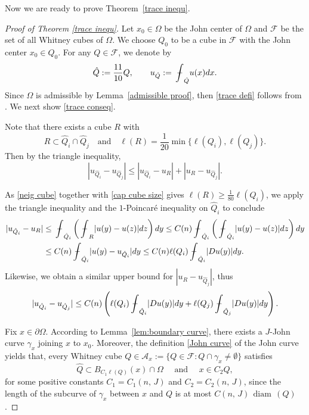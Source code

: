 \documentclass[reqno,11pt]{amsart}
\def\bint{{\ifinner\rlap{\bf\kern.35em--}
\int\else\rlap{\bf\kern.45em--}\int\fi}\ignorespaces}
\def\diam{{\mathop\mathrm{\,diam\,}}}
\numberwithin{equation}{section}
\theoremstyle{remark}
\def\bint{{\ifinner\rlap{\bf\kern.35em--}
\int\else\rlap{\bf\kern.45em--}\int\fi}\ignorespaces}
\begin{document}
Now we are ready to prove Theorem~\ref{trace inequ}.
\begin{proof}[Proof of Theorem \ref{trace inequ}]

Let $x_0\in \Omega$ be the John center of $\Omega$ and $\mathscr{F}$ be the set of all Whitney cubes of $\Omega$. We choose $Q_0$ to be a cube in $\mathscr{F}$ with the John center $x_0\in Q_0$. For any $Q\in \mathscr{F}$, we denote by
$$\hat{Q}:=\frac{11}{10}Q,\qquad  u_{\hat{Q}}:=\bint_{\hat{Q}} u(x)dx.$$ 
Since $\Omega$ is admissible by Lemma~\ref{admissible proof}, then 
\eqref{trace defi} follows from  \cite[Theorem 5.14.4]{Z1989}.  We next show \eqref{trace conseq}. 

\medskip

Note that there exists a cube $R$  with 
\begin{equation}\label{cap cube size}
    R\subset \hat{Q}_i\cap \hat{Q}_j\quad \text{and} \quad \ell(R)=\frac{1}{20}\min\{\ell(Q_i),\ell(Q_j)\}. 
\end{equation}
Then by the triangle inequality,  
$$|u_{\hat{Q
}_i}-u_{\hat{Q
}_j}|\le |u_{\hat{Q}_i}-u_R|+|u_R-u_{\hat{Q}_j}|.$$

As \eqref{neig cube} together with \eqref{cap cube size} gives $\ell(R)\ge \frac{1}{80}\ell(Q_i)$,  we apply the triangle inequality and  the $1$-Poincar\'e inequality on $\hat{Q}_i$ to conclude 
\begin{align}\label{poin 2}
    |u_{\hat{Q}_i}-u_R|&\le \bint_{\hat{Q}_i}\left(\bint_{R}|u(y)-u(z)|dz\right)dy\le C(n)\bint_{\hat{Q}_i}\left(\bint_{\hat{Q}_i}|u(y)-u(z)|dz\right)dy\nonumber\\
    & \le C(n)\bint_{\hat{Q}_i}|u(y)-u_{\hat{Q}_i}|dy \le C(n)\ell(Q_i)\bint_{\hat{Q}_i}|Du(y)|dy.  
\end{align}
Likewise, we obtain a similar upper bound for $|u_R-u_{\hat{Q}_j}|$, thus
\begin{equation}\label{estimate cube 6}
    |u_{\hat{Q}_i}-u_{\hat{Q}_j}|\le  C(n)\left(\ell(Q_i)\bint_{\hat{Q}_i}|Du(y)|dy+\ell(Q_j)\bint_{\hat{Q}_j}|Du(y)|dy\right).
\end{equation}



Fix $x\in \partial \Omega$. 
According to Lemma~\ref{lem:boundary curve},  there exists a $J$-John curve $\gamma_x$ joining $x$ to $x_0$. Moreover, the definition \eqref{John curve} of the John curve yields that, every Whitney cube $Q\in \mathscr{A}_x:=\{Q\in\mathscr{F}:Q\cap \gamma_x\neq\emptyset\}$  satisfies 
\begin{equation}\label{John cube}
    \hat{Q}\subset B_{C_1\ell(Q)}(x)\cap \Omega \quad \text{ and } \quad   x\in C_2Q,
\end{equation}
for some positive constants  $C_1=C_1(n,\,J)$ and $C_2=C_2(n,\,J)$, since the length of the subcurve of $\gamma_x$  between $x$ and $Q$ is at most $C(n,\,J)\diam(Q)$. 


\end{proof}
\end{document}
